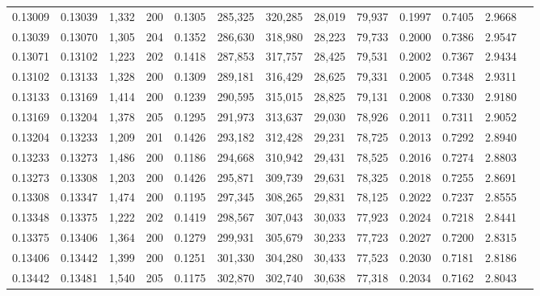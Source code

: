 \begin{tabular}{rrrrrrrrrrrrr}
0.13009 & 0.13039 & 1,332 & 200 &                                     0.1305 & 285,325 & 320,285 &  28,019 &  79,937 & 0.1997 & 0.7405 & 2.9668 \\
0.13039 & 0.13070 & 1,305 & 204 &                                     0.1352 & 286,630 & 318,980 &  28,223 &  79,733 & 0.2000 & 0.7386 & 2.9547 \\
0.13071 & 0.13102 & 1,223 & 202 &                                     0.1418 & 287,853 & 317,757 &  28,425 &  79,531 & 0.2002 & 0.7367 & 2.9434 \\
0.13102 & 0.13133 & 1,328 & 200 &                                     0.1309 & 289,181 & 316,429 &  28,625 &  79,331 & 0.2005 & 0.7348 & 2.9311 \\
0.13133 & 0.13169 & 1,414 & 200 &                                     0.1239 & 290,595 & 315,015 &  28,825 &  79,131 & 0.2008 & 0.7330 & 2.9180 \\
0.13169 & 0.13204 & 1,378 & 205 &                                     0.1295 & 291,973 & 313,637 &  29,030 &  78,926 & 0.2011 & 0.7311 & 2.9052 \\
0.13204 & 0.13233 & 1,209 & 201 &                                     0.1426 & 293,182 & 312,428 &  29,231 &  78,725 & 0.2013 & 0.7292 & 2.8940 \\
0.13233 & 0.13273 & 1,486 & 200 &                                     0.1186 & 294,668 & 310,942 &  29,431 &  78,525 & 0.2016 & 0.7274 & 2.8803 \\
0.13273 & 0.13308 & 1,203 & 200 &                                     0.1426 & 295,871 & 309,739 &  29,631 &  78,325 & 0.2018 & 0.7255 & 2.8691 \\
0.13308 & 0.13347 & 1,474 & 200 &                                     0.1195 & 297,345 & 308,265 &  29,831 &  78,125 & 0.2022 & 0.7237 & 2.8555 \\
0.13348 & 0.13375 & 1,222 & 202 &                                     0.1419 & 298,567 & 307,043 &  30,033 &  77,923 & 0.2024 & 0.7218 & 2.8441 \\
0.13375 & 0.13406 & 1,364 & 200 &                                     0.1279 & 299,931 & 305,679 &  30,233 &  77,723 & 0.2027 & 0.7200 & 2.8315 \\
0.13406 & 0.13442 & 1,399 & 200 &                                     0.1251 & 301,330 & 304,280 &  30,433 &  77,523 & 0.2030 & 0.7181 & 2.8186 \\
0.13442 & 0.13481 & 1,540 & 205 &                                     0.1175 & 302,870 & 302,740 &  30,638 &  77,318 & 0.2034 & 0.7162 & 2.8043 \\

\end{tabular}
